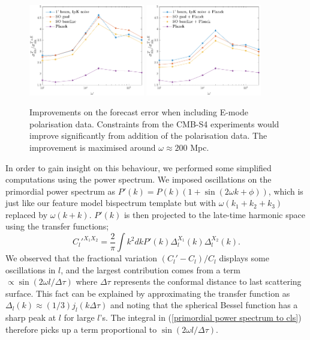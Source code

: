 \begin{figure}[ht]
	\includegraphics[width=0.45\textwidth]{improvement_ratio.pdf}
	\includegraphics[width=0.45\textwidth]{improvement_ratio_combined.pdf}
	\caption{Improvements on the forecast error when including E-mode polarisation data. Constraints from the CMB-S4 experiments would improve significantly from addition of the polarisation data. The improvement is maximised around $\omega\approx200$ Mpc.}
	\label{forecast improvement ratio}
\end{figure}

In order to gain insight on this behaviour, we performed some simplified computations using the power spectrum. We imposed oscillations on the primordial power spectrum as $P'(k) = P(k)(1+\sin(2\omega k + \phi))$, which is just like our feature model bispectrum template but with $\omega(k_1+k_2+k_3)$ replaced by $\omega(k+k)$. $P'(k)$ is then projected to the late-time harmonic space using the transfer functions;
\begin{equation}
	C_l'^{X_1 X_2} = \frac{2}{\pi} \int k^2 dk P'(k) \Delta_l^{X_1}(k) \Delta_l^{X_2}(k).
	\label{primordial power spectrum to cls}
\end{equation}
We observed that the fractional variation $(C_l'-C_l)/C_l$ displays some oscillations in $l$, and the largest contribution comes from a term $\propto \sin(2\omega l/\Delta\tau)$ where $\Delta\tau$ represents the conformal distance to last scattering surface. This fact can be explained by approximating the transfer function as $\Delta_l(k)\approx (1/3)j_l(k\Delta\tau)$ and noting that the spherical Bessel function has a sharp peak at $l$ for large $l$'s. The integral in (\ref{primordial power spectrum to cls}) therefore picks up a term proportional to $\sin(2\omega l/\Delta\tau)$.

